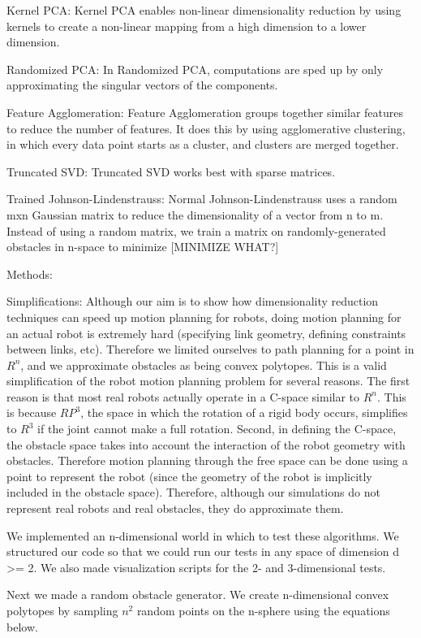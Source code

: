 \documentclass[12pt]{article}
\begin{document}
Kernel PCA: Kernel PCA enables non-linear dimensionality reduction by using kernels to create a non-linear mapping from a high dimension to a lower dimension.

Randomized PCA: In Randomized PCA, computations are sped up by only approximating the singular vectors of the components.

Feature Agglomeration: Feature Agglomeration groups together similar features to reduce the number of features. It does this by using agglomerative clustering, in which every data point starts as a cluster, and clusters are merged together.

Truncated SVD: Truncated SVD works best with sparse matrices.

Trained Johnson-Lindenstrauss: Normal Johnson-Lindenstrauss uses a random mxn Gaussian matrix to reduce the dimensionality of a vector from n to m. Instead of using a random matrix, we train a matrix on randomly-generated obstacles in n-space to minimize [MINIMIZE WHAT?]

Methods:

Simplifications: Although our aim is to show how dimensionality reduction techniques can speed up motion planning for robots, doing motion planning for an actual robot is extremely hard (specifying link geometry, defining constraints between links, etc). Therefore we limited ourselves to path planning for a point in $R^{n}$, and we approximate obstacles as being convex polytopes. This is a valid simplification of the robot motion planning problem for several reasons. The first reason is that most real robots actually operate in a C-space similar to $R^{n}$. This is because $RP^{3}$, the space in which the rotation of a rigid body occurs, simplifies to $R^{3}$ if the joint cannot make a full rotation. Second, in defining the C-space, the obstacle space takes into account the interaction of the robot geometry with obstacles. Therefore motion planning through the free space can be done using a point to represent the robot (since the geometry of the robot is implicitly included in the obstacle space). Therefore, although our simulations do not represent real robots and real obstacles, they do approximate them.

We implemented an n-dimensional world in which to test these algorithms. We structured our code so that we could run our tests in any space of dimension d >= 2. We also made visualization scripts for the 2- and 3-dimensional tests.

Next we made a random obstacle generator. We create n-dimensional convex polytopes by sampling $n^{2}$ random points on the n-sphere using the equations below. 
\end{document}
